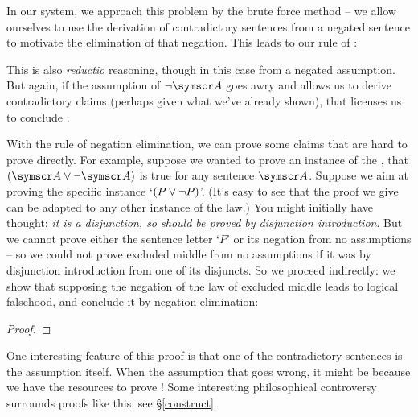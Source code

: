 In our system, we approach this problem by the brute force method – we allow ourselves to use the derivation of contradictory sentences from a negated sentence to motivate the elimination of that negation. This leads to our rule of :

This is also \emph{reductio} reasoning, though in this case from a negated assumption. But again, if the assumption of $\enot \meta{A}$ goes awry and allows us to derive contradictory claims (perhaps given what we've already shown), that licenses us to conclude .

With the rule of negation elimination, we can prove some claims that are hard to prove directly. For example, suppose we wanted to prove an instance of the ,\label{excmidd} that $(\meta{A} \eor \enot \meta{A})$ is true for any sentence $\meta{A}$. Suppose we aim at proving the specific instance `$(P \vee \neg P)$'. (It's easy to see that the proof we give can be adapted to any other instance of the law.) You might initially have thought: \emph{it is a disjunction, so should be proved by disjunction introduction}. But we cannot prove either the sentence letter `$P$' or its negation from no assumptions – so we could not prove excluded middle from no assumptions if it was by disjunction introduction from one of its disjuncts. So we proceed indirectly: we show that supposing the negation of the law of excluded middle leads to logical falsehood, and conclude it by negation elimination: \begin{proof}
	\open {}
	\open
	\close
	\close
\end{proof}
One interesting feature of this proof is that one of the contradictory sentences is the assumption itself. When the assumption that \enot{} goes wrong, it might be because we have the resources to prove ! Some interesting philosophical controversy surrounds proofs like this: see §\ref{construct}.

